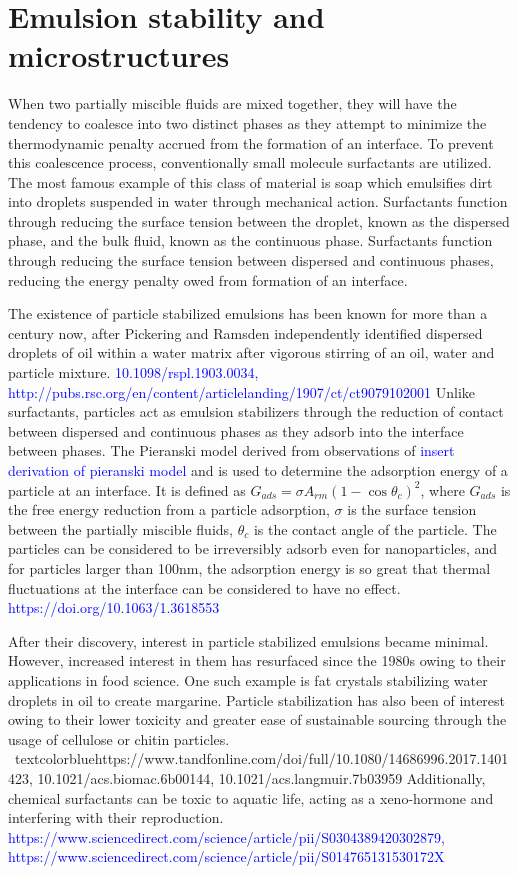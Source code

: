 \section{Emulsion stability and microstructures}

When two partially miscible fluids are mixed together, they will have the tendency to coalesce into two distinct phases as they attempt to minimize 
the thermodynamic penalty accrued from the formation of an interface. To prevent this coalescence process, conventionally small molecule surfactants 
are utilized. The most famous example of this class of material is soap which emulsifies dirt into droplets suspended in water through mechanical action. 
Surfactants function through reducing the surface tension between the droplet, known as the dispersed phase, and the bulk fluid, known as the continuous 
phase. Surfactants function through reducing the surface tension between dispersed and continuous phases, reducing the energy penalty owed from formation 
of an interface.

The existence of particle stabilized emulsions has been known for more than a century now, after Pickering and Ramsden independently identified dispersed 
droplets of oil within a water matrix after vigorous stirring of an oil, water and particle mixture. 
\textcolor{blue}{10.1098/rspl.1903.0034, http://pubs.rsc.org/en/content/articlelanding/1907/ct/ct9079102001} Unlike surfactants, 
particles act as emulsion stabilizers through the reduction of contact between dispersed and continuous phases as they adsorb into 
the interface between phases. The Pieranski model derived from observations of \textcolor{blue}{insert derivation of pieranski model} 
and is used to determine the adsorption energy of a particle at an interface. It is defined as $G_{ads} = \sigma A_{rm} (1 - \cos{\theta_c})^2$, where $G_{ads}$ 
is the free energy reduction from a particle adsorption, $\sigma$ is the surface tension between the partially miscible fluids, $\theta_c$ is the contact angle 
of the particle. The particles can be considered to be irreversibly adsorb even for nanoparticles, and for particles larger than 100nm, the adsorption energy 
is so great that thermal fluctuations at the interface can be considered to have no effect. \textcolor{blue}{https://doi.org/10.1063/1.3618553} 

After their discovery, interest in particle stabilized emulsions became minimal. However, increased interest in them has resurfaced since the 1980s owing to 
their applications in food science. One such example is fat crystals stabilizing water droplets in oil to create margarine. Particle stabilization has also 
been of interest owing to their lower toxicity and greater ease of sustainable sourcing through the usage of cellulose or chitin particles. \
textcolor{blue}{https://www.tandfonline.com/doi/full/10.1080/14686996.2017.1401423, 10.1021/acs.biomac.6b00144, 10.1021/acs.langmuir.7b03959} 
Additionally, chemical surfactants can be toxic to aquatic life, acting as a xeno-hormone and interfering with their reproduction. 
\textcolor{blue}{https://www.sciencedirect.com/science/article/pii/S0304389420302879, https://www.sciencedirect.com/science/article/pii/S014765131530172X} 

